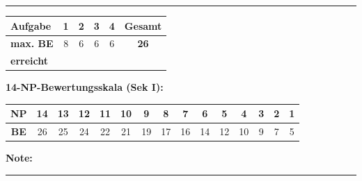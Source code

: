 \documentclass[11pt, a4paper]{article}
\newcommand{\luecke}[1]{\rule{#1}{0.4pt}}
\begin{document}
\vspace{25pt}
\hrule
\vspace{10pt}

\noindent
\begin{tabularx}{\textwidth}{|X|c|c|c|c||c|}
\hline
\textbf{Aufgabe} & 1 & 2 & 3 & 4 & \textbf{Gesamt} \\
\hline
\textbf{max. BE} & 8 & 6 & 6 & 6 & \textbf{26} \\
\hline
\textbf{erreicht} & & & & & \\[0.8em]
\hline
\end{tabularx}

\vspace{15pt}


\noindent\textbf{14-NP-Bewertungsskala (Sek I):}

\vspace{0.5em}

\noindent
\begin{tabularx}{\textwidth}{|c|c|c|c|c|c|c|c|c|c|c|c|c|c|c|}
\hline
\textbf{NP} & 14 & 13 & 12 & 11 & 10 & 9 & 8 & 7 & 6 & 5 & 4 & 3 & 2 & 1 \\
\hline
\textbf{BE} & 26 & 25 & 24 & 22 & 21 & 19 & 17 & 16 & 14 & 12 & 10 & 9 & 7 & 5 \\
\hline
\end{tabularx}

\vspace{10pt}

\begin{flushright}
\textbf{Note:} \luecke{2cm}
\end{flushright}
\end{document}
